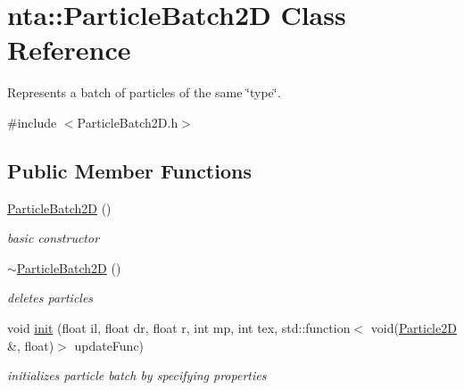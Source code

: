 \hypertarget{classnta_1_1ParticleBatch2D}{}\section{nta\+:\+:Particle\+Batch2D Class Reference}
\label{classnta_1_1ParticleBatch2D}


Represents a batch of particles of the same \char`\"{}type\char`\"{}.  




{\ttfamily \#include $<$Particle\+Batch2\+D.\+h$>$}

\subsection*{Public Member Functions}
\begin{DoxyCompactItemize}
\item 
\mbox{\label{classnta_1_1ParticleBatch2D_af81efd4598cd578c2eddbcab6b5d3f5d}} 
\hyperlink{classnta_1_1ParticleBatch2D_af81efd4598cd578c2eddbcab6b5d3f5d}{Particle\+Batch2D} ()
\begin{DoxyCompactList}\small\item\em basic constructor \end{DoxyCompactList}\item 
\mbox{\label{classnta_1_1ParticleBatch2D_ac21b6437fdd8e746c6fce095b4dbc03a}} 
\hyperlink{classnta_1_1ParticleBatch2D_ac21b6437fdd8e746c6fce095b4dbc03a}{$\sim$\+Particle\+Batch2D} ()
\begin{DoxyCompactList}\small\item\em deletes particles \end{DoxyCompactList}\item 
\mbox{\label{classnta_1_1ParticleBatch2D_a328f04a39eb9baa821ad95b2f455a7b0}} 
void \hyperlink{classnta_1_1ParticleBatch2D_a328f04a39eb9baa821ad95b2f455a7b0}{init} (float il, float dr, float r, int mp, int tex, std\+::function$<$ void(\hyperlink{structnta_1_1Particle2D}{Particle2D} \&, float)$>$ update\+Func)
\begin{DoxyCompactList}\small\item\em initializes particle batch by specifying properties \end{DoxyCompactList}\item 

\end{DoxyCompactItemize}
